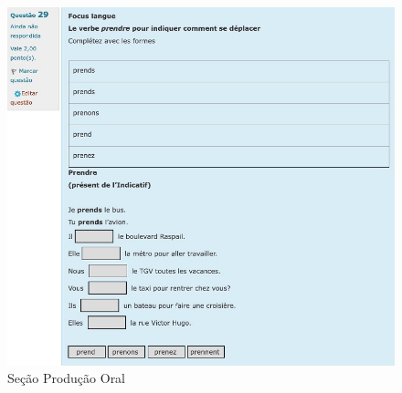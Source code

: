 \begin{figure}[htbp]
	\centering
	\begin{minipage}{0.8\textwidth}
		\includegraphics[width=\textwidth]{imagem4.png}
		\caption{Seção Produção Oral}
		\label{fig-4}
	\end{minipage}
\end{figure}

